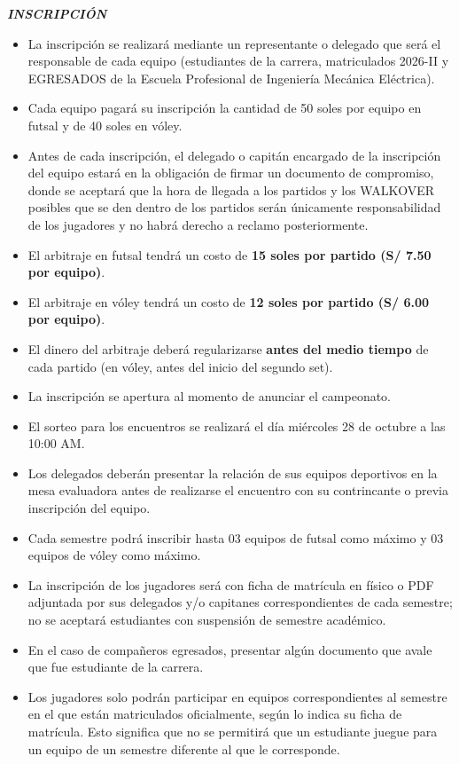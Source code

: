 \documentclass[11pt,a4paper]{article}
\newcommand{\titulo}[1]{\par\medskip\textbf{\textit{#1}}\par}
\begin{document}
\titulo{INSCRIPCIÓN}
\begin{itemize}
	\item La inscripción se realizará mediante un representante o delegado que será el responsable de cada equipo (estudiantes de la carrera, matriculados 2026-II y EGRESADOS de la Escuela Profesional de Ingeniería Mecánica Eléctrica).
	\item Cada equipo pagará su inscripción la cantidad de 50 soles por equipo en futsal y de 40 soles en vóley.
	\item Antes de cada inscripción, el delegado o capitán encargado de la inscripción del equipo estará en la obligación de firmar un documento de compromiso, donde se aceptará que la hora de llegada a los partidos y los WALKOVER posibles que se den dentro de los partidos serán únicamente responsabilidad de los jugadores y no habrá derecho a reclamo posteriormente.
	\item El arbitraje en futsal tendrá un costo de \textbf{15 soles por partido (S/ 7.50 por equipo)}.
	\item El arbitraje en vóley tendrá un costo de \textbf{12 soles por partido (S/ 6.00 por equipo)}.
	\item El dinero del arbitraje deberá regularizarse \textbf{antes del medio tiempo} de cada partido (en vóley, antes del inicio del segundo set).
	\item La inscripción se apertura al momento de anunciar el campeonato.
	\item El sorteo para los encuentros se realizará el día miércoles 28 de octubre a las 10:00 AM.
	\item Los delegados deberán presentar la relación de sus equipos deportivos en la mesa evaluadora antes de realizarse el encuentro con su contrincante o previa inscripción del equipo.
	\item Cada semestre podrá inscribir hasta 03 equipos de futsal como máximo y 03 equipos de vóley como máximo.
	\item La inscripción de los jugadores será con ficha de matrícula en físico o PDF adjuntada por sus delegados y/o capitanes correspondientes de cada semestre; no se aceptará estudiantes con suspensión de semestre académico.
	\item En el caso de compañeros egresados, presentar algún documento que avale que fue estudiante de la carrera.
	\item Los jugadores solo podrán participar en equipos correspondientes al semestre en el que están matriculados oficialmente, según lo indica su ficha de matrícula. Esto significa que no se permitirá que un estudiante juegue para un equipo de un semestre diferente al que le corresponde.

\end{itemize}
\end{document}

